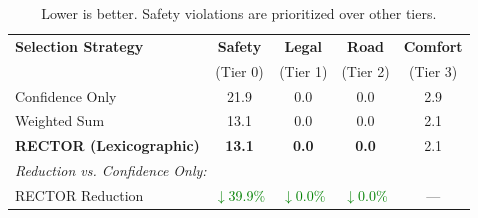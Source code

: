 \begin{table}[t]
\centering
\caption{Tier-wise Violation Rates by Selection Strategy (\%)}
\label{tab:tier_violations}
\begin{tabular}{lcccc}
\toprule
\textbf{Selection Strategy} & \textbf{Safety} & \textbf{Legal} & \textbf{Road} & \textbf{Comfort} \\
 & (Tier 0) & (Tier 1) & (Tier 2) & (Tier 3) \\
\midrule
Confidence Only & 21.9 & 0.0 & 0.0 & 2.9 \\
Weighted Sum & 13.1 & 0.0 & 0.0 & 2.1 \\
\textbf{RECTOR (Lexicographic)} & \textbf{13.1} & \textbf{0.0} & \textbf{0.0} & 2.1 \\
\midrule
\multicolumn{5}{l}{\textit{Reduction vs. Confidence Only:}} \\
RECTOR Reduction & \textcolor{green}{$\downarrow$39.9\%} & \textcolor{green}{$\downarrow$0.0\%} & \textcolor{green}{$\downarrow$0.0\%} & --- \\
\bottomrule
\end{tabular}
\vspace{1mm}
\caption*{\footnotesize Lower is better. Safety violations are prioritized over other tiers.}
\end{table}

